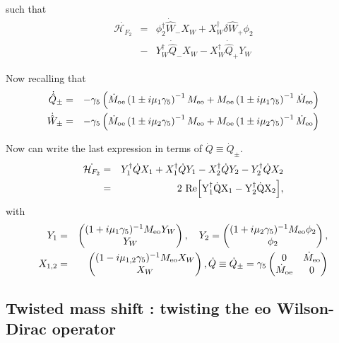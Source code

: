 \documentclass{article}[12pt]
\begin{document}
such that
\begin{eqnarray}
\dot{\mathcal{H}_{F_2}} &=& \phi_2^\dagger  \dot{\hat{W}}_- X_W +
X_W^\dagger  \delta \hat{W}_+ \phi_2 \\
&-& Y_W^\dagger \dot{\hat{Q}}_- X_W - X_W^\dagger   \dot{\hat{Q}}_+  Y_W
\end{eqnarray}

Now recalling that
\begin{eqnarray}
\dot{\hat{Q}}_{\pm} &=&  -\gamma_5 \left(   \dot{M}_{\rm{oe}}
  \left(1\pm i\mu_1 \gamma_5\right)^{-1} M_{\rm{eo}}   + M_{\rm{oe}}
    \left( 1\pm i\mu_1 \gamma_5\right)^{-1} \dot{M}_{\rm{eo}}\right)  \\
\dot{\hat{W}}_{\pm} &=&  -\gamma_5 \left(   \dot{M}_{\rm{oe}}
  \left(1\pm i\mu_2 \gamma_5\right)^{-1} M_{\rm{eo}} +  M_{\rm{oe}}
    \left( 1\pm i\mu_2 \gamma_5\right)^{-1} \dot{M}_{\rm{eo}}\right)
\end{eqnarray}

Now can write the last expression in terms of $\dot{Q} \equiv
\dot{Q}_{\pm} $.
\begin{eqnarray}
\dot{\mathcal{H}_{F_2}} &=& Y_1^\dagger \dot{Q} X_1 + X_1^\dagger
\dot{Q} Y_1 - X_2^\dagger \dot{Q} Y_2  - Y_2^\dagger \dot{Q} X_2 \\
&=& 2~ \rm{Re}\Big[ Y_1^\dagger \dot{Q} X_1 - Y_2^\dagger \dot{Q}
X_2 \Big],
\end{eqnarray}
with
\begin{eqnarray}
Y_1 &=& \begin{pmatrix}  (1+i\mu_1\gamma_5)^{-1} M_{\rm{eo}} Y_W \\
  Y_W \end{pmatrix},\quad Y_2  =  \begin{pmatrix}  (1+i\mu_2\gamma_5)^{-1} M_{\rm{eo}} \phi_2 \\
  \phi_2 \end{pmatrix},\\
X_{1,2} &=&  \begin{pmatrix}  (1-i\mu_{1,2}\gamma_5)^{-1} M_{\rm{eo}} X_W \\
  X_W \end{pmatrix}, \dot{Q} \equiv  \dot{Q}_{\pm} =  \gamma_5 \begin{pmatrix}
 0  & \dot{M}_{\rm{eo}} \\
\dot{M}_{\rm{oe}} & 0\\
\end{pmatrix}
\end{eqnarray}

\subsection{Twisted mass shift :  twisting the  eo  Wilson-Dirac  operator}
\end{document}

